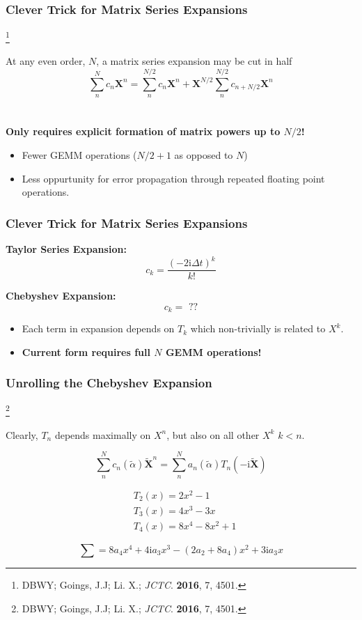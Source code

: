 \documentclass{beamer}
\newcommand\blfootnote[1]{%
  \begingroup
  \renewcommand\thefootnote{}\footnote{#1}%
  \addtocounter{footnote}{-1}%
  \endgroup
}
\begin{document}
\begin{frame}
\frametitle{Clever Trick for Matrix Series Expansions}
\blfootnote{DBWY; Goings, J.J; Li. X.; \emph{JCTC}. \textbf{2016}, 7, 4501.}

At any even order, $N$,  a matrix series expansion may be cut in half
\begin{equation*}
\sum_n^N c_n \mathbf{X}^n = \sum_n^{N/2} c_n \mathbf{X}^n + \mathbf{X}^{N/2}\sum_n^{N/2} c_{n+N/2}\mathbf{X}^n
\end{equation*}
~\\
~\\

{ \bf
Only requires explicit formation of matrix powers up to $N/2$!
}
\begin{itemize}
  \item Fewer GEMM operations ($N/2 + 1$ as opposed to $N$)
  \item Less oppurtunity for error propagation through repeated floating point operations.
\end{itemize}
\end{frame}


\begin{frame}
\frametitle{Clever Trick for Matrix Series Expansions}

\textbf{Taylor Series Expansion:}
\begin{equation*}
c_k = \frac{(-2\mathrm{i}\Delta t)^k}{k!}
\end{equation*}

\textbf{Chebyshev Expansion:}
\begin{equation*}
c_k = \text{ ??}
\end{equation*}
\begin{itemize}
  \item Each term in expansion depends on $T_k$ which non-trivially is related to $X^k$.
  \item \bf Current form requires full $N$ GEMM operations!
\end{itemize}
\end{frame}

\begin{frame}
\frametitle{Unrolling the Chebyshev Expansion}
\blfootnote{DBWY; Goings, J.J; Li. X.; \emph{JCTC}. \textbf{2016}, 7, 4501.}

Clearly, $T_n$ depends maximally on $X^n$, but also on all other $X^k$ $k < n$.

\begin{equation*}
\sum_n^N c_n(\tilde{\alpha}) \mathbf{\tilde{X}}^n = \sum_n^N  a_n(\tilde{\alpha})T_n(-\mathrm{i}\tilde{\mathbf{X}})
\end{equation*}

\begin{align*}
&T_2(x) = 2x^2 - 1\\
&T_3(x) = 4x^3 - 3x\\
&T_4(x) = 8x^4 - 8x^2 + 1
\end{align*}

\begin{equation*}
\sum = 8a_4x^4 + 4\mathrm{i}a_3x^3 - (2a_2 + 8a_4)x^2 + 3\mathrm{i}a_3x
\end{equation*}

\end{frame}
\end{document}
